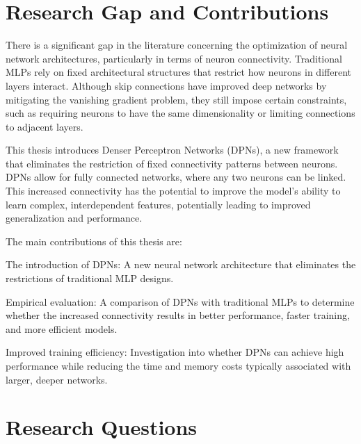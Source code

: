 \section{Research Gap and Contributions}

There is a significant gap in the literature concerning the optimization of neural network architectures, particularly in terms of neuron connectivity. Traditional MLPs rely on fixed architectural structures that restrict how neurons in different layers interact. Although skip connections have improved deep networks by mitigating the vanishing gradient problem, they still impose certain constraints, such as requiring neurons to have the same dimensionality or limiting connections to adjacent layers.

This thesis introduces Denser Perceptron Networks (DPNs), a new framework that eliminates the restriction of fixed connectivity patterns between neurons. DPNs allow for fully connected networks, where any two neurons can be linked. This increased connectivity has the potential to improve the model’s ability to learn complex, interdependent features, potentially leading to improved generalization and performance.

The main contributions of this thesis are:

The introduction of DPNs: A new neural network architecture that eliminates the restrictions of traditional MLP designs.

Empirical evaluation: A comparison of DPNs with traditional MLPs to determine whether the increased connectivity results in better performance, faster training, and more efficient models.

Improved training efficiency: Investigation into whether DPNs can achieve high performance while reducing the time and memory costs typically associated with larger, deeper networks.


\section{Research Questions}

